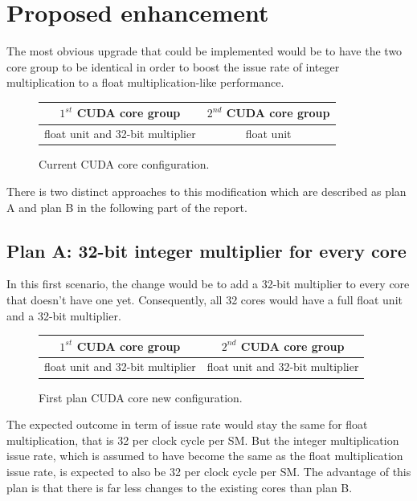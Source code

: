 \documentclass{report}
\begin{document}
   \section{Proposed enhancement}
   The most obvious upgrade that could be implemented would be to have the two core group to be identical in order to boost the issue rate of integer multiplication to a float multiplication-like performance.
   \begin{figure}[H]
      \centering
       \begin{tabular}{ | c | c | }
    	    \hline
    	    $1^{st}$ CUDA core group & $2^{nd}$ CUDA core group \\ \hline
    	   float unit and 32-bit multiplier & float unit \\ \hline
  	\end{tabular}
  	\captionsetup{justification=centering}
  	\caption{Current CUDA core configuration.}
  	\label{fig:current_cores}
   \end{figure}
   There is two distinct approaches to this modification which are described as plan A and plan B in the following part of the report.
   \subsection{Plan A: 32-bit integer multiplier for every core}
    In this first scenario, the change would be to add a 32-bit multiplier to every core that doesn't have one yet. Consequently, all 32 cores would have a full float unit and a 32-bit multiplier.
    \begin{figure}[H]
      \centering
       \begin{tabular}{ | c | c | }
    	    \hline
    	    $1^{st}$ CUDA core group & $2^{nd}$ CUDA core group \\ \hline
    	   float unit and 32-bit multiplier & float unit and 32-bit multiplier \\ \hline
  	\end{tabular}
  	\captionsetup{justification=centering}
  	\caption{First plan CUDA core new configuration.}
  	\label{fig:planA_cores}
   \end{figure}
    The expected outcome in term of issue rate would stay the same for float multiplication, that is 32 per clock cycle per SM. But the integer multiplication issue rate, which is assumed to have become the same as the float multiplication issue rate, is expected to also be 32 per clock cycle per SM.
    The advantage of this plan is that there is far less changes to the existing cores than plan B.
\end{document}
